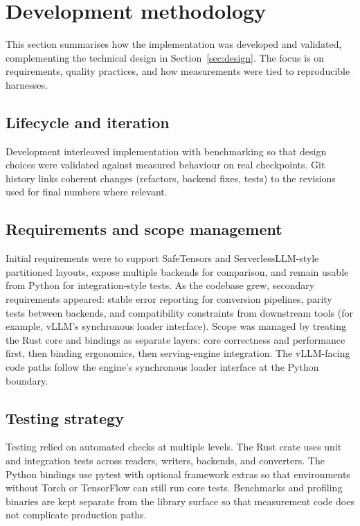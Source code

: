 \section{Development methodology}
\label{sec:engineering_process}

This section summarises how the implementation was developed and validated, complementing the technical design in Section~\ref{sec:design}. The focus is on requirements, quality practices, and how measurements were tied to reproducible harnesses.

\subsection{Lifecycle and iteration}

Development interleaved implementation with benchmarking so that design choices were validated against measured behaviour on real checkpoints. Git history links coherent changes (refactors, backend fixes, tests) to the revisions used for final numbers where relevant.

\subsection{Requirements and scope management}

Initial requirements were to support SafeTensors and ServerlessLLM-style partitioned layouts, expose multiple backends for comparison, and remain usable from Python for integration-style tests. As the codebase grew, secondary requirements appeared: stable error reporting for conversion pipelines, parity tests between backends, and compatibility constraints from downstream tools (for example, vLLM's synchronous loader interface). Scope was managed by treating the Rust core and bindings as separate layers: core correctness and performance first, then binding ergonomics, then serving-engine integration. The vLLM-facing code paths follow the engine's synchronous loader interface at the Python boundary.

\subsection{Testing strategy}

Testing relied on automated checks at multiple levels. The Rust crate uses unit and integration tests across readers, writers, backends, and converters. The Python bindings use pytest with optional framework extras so that environments without Torch or TensorFlow can still run core tests. Benchmarks and profiling binaries are kept separate from the library surface so that measurement code does not complicate production paths.

